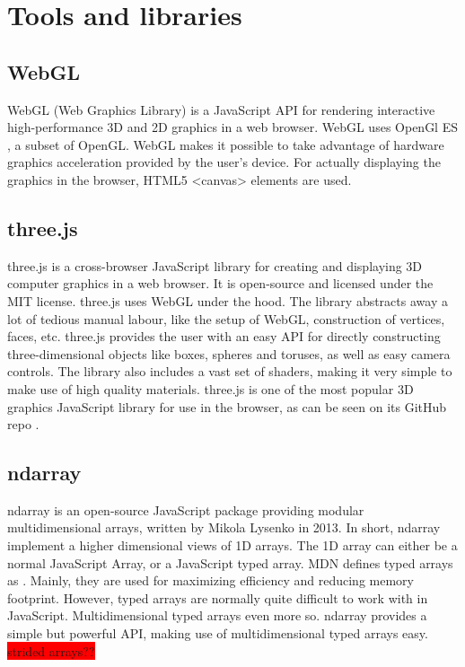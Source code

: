 \section{Tools and libraries}
\subsection{WebGL}
WebGL (Web Graphics Library) \cite{webgl} is a JavaScript API for rendering interactive high-performance 3D and 2D graphics in a web browser. WebGL uses OpenGl ES \cite{opengl-es}, a subset of OpenGL. WebGL makes it possible to take advantage of hardware graphics acceleration provided by the user's device. For actually displaying the graphics in the browser, HTML5 <canvas> elements are used. 

\subsection{three.js}
three.js\cite{three.js} is a cross-browser JavaScript library for creating and displaying 3D computer graphics in a web browser. It is open-source and licensed under the MIT license. three.js uses WebGL under the hood. The library abstracts away a lot of tedious manual labour, like the setup of WebGL, construction of vertices, faces, etc. three.js provides the user with an easy API for directly constructing three-dimensional objects like boxes, spheres and toruses, as well as easy camera controls. The library also includes a vast set of shaders, making it very simple to make use of high quality materials. three.js is one of the most popular 3D graphics JavaScript library for use in the browser, as can be seen on its GitHub repo \cite{three.js}.

\subsection{ndarray}
\label{sec:theory-ndarray}
ndarray is an open-source JavaScript package providing modular multidimensional arrays, written by Mikola Lysenko in 2013. In short, ndarray implement a higher dimensional views of 1D arrays. The 1D array can either be a normal JavaScript Array, or a JavaScript typed array. MDN defines typed arrays as . Mainly, they are used for maximizing efficiency and reducing memory footprint. However, typed arrays are normally quite difficult to work with in JavaScript. Multidimensional typed arrays even more so. ndarray provides a simple but powerful API, making use of multidimensional typed arrays easy.
\colorbox{red}{strided arrays??}

